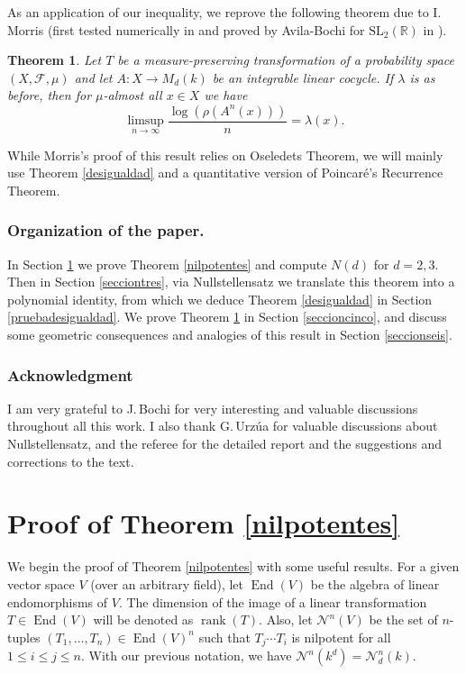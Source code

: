 \documentclass[JEP,XML,SOM,Unicode,NoEqCountersInSection]{cedram}
\let\mathcal\mathscr
\theoremstyle{plain}
\newtheorem{teo}{Theorem}[section]
\theoremstyle{definition}
\newcommand{\RR}{\mathbb{R}}
\newcommand{\ccl}[3]{#1^{#2}(#3)}
\DeclareMathOperator{\End}{End}
\DeclareMathOperator{\rank}{rank}
\begin{document}
As an application of our inequality, we reprove the following theorem due to I.\,Morris (first tested numerically in \cite{fisicos} and proved by Avila-Bochi for $\mathrm{SL}_{2}(\RR)$ in \cite[Th.\,15]{avibochi}).

\begin{teo}\label{bergerwangnuevo}\cite[Th.\,1.6]{morrisbw}
Let $T$ be a measure-preserving transformation of a probability space $(X,\mathcal{F},\mu)$ and let $A: X \rightarrow M_{d}(k)$ be an integrable linear cocycle. If $\lambda$ is as before, then for $\mu$-almost all $x\in X$ we have
\begin{equation}\label{bww}
\limsup_{n\to \infty}{\frac{\log(\rho(\ccl{A}{n}{x}))}{n}=\lambda(x)}.
\end{equation}
\end{teo}

While Morris's proof of this result relies on Oseledets Theorem, we will mainly use Theorem \ref{desigualdad} and a quantitative version of Poincaré's Recurrence Theorem.

\subsubsection*{Organization of the paper.} In Section \ref{secciondos} we prove Theorem \ref{nilpotentes} and compute $N(d)$ for $d=2,3$. Then in Section \ref{secciontres}, via Nullstellensatz we translate this theorem into a polynomial identity, from which we deduce Theorem \ref{desigualdad} in Section \ref{pruebadesigualdad}. We prove Theorem \ref{bergerwangnuevo} in Section \ref{seccioncinco}, and discuss some geometric consequences and analogies of this result in Section \ref{seccionseis}.

\subsubsection*{Acknowledgment}
I am very grateful to J.\,Bochi for very interesting and valuable discussions throughout all this work. I also thank G.\,Urzúa for valuable discussions about Nullstellensatz, and the referee for the detailed report and the suggestions and corrections to the text.

\section{Proof of Theorem \ref{nilpotentes}}\label{secciondos}

We begin the proof of Theorem \ref{nilpotentes} with some useful results. For a given vector space $V$ (over an arbitrary field), let $\End(V)$ be the algebra of linear endomorphisms of $V$. The dimension of the image of a linear transformation $T\in \End(V)$ will be denoted as $\rank(T)$. Also, let $\mathcal{N}^{n}(V)$ be the set of $n$-tuples $(T_1,\dots,T_n)\in \End(V)^{n}$ such that $T_{j}\cdots T_{i}$ is nilpotent for all $1\leq i \leq j \leq n$. With our previous notation, we have $\mathcal{N}^{n}(k^{d})=\mathcal{N}^{n}_{d}(k)$.
\end{document}
